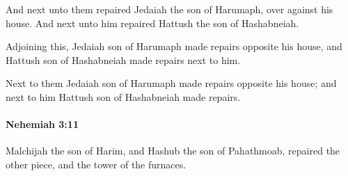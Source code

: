 			\begin{versebox}
					\item[BHS] 
					\item[LXX] 
					\item[ASV] And next unto them repaired Jedaiah the son of Harumaph, over against his house. And next unto him repaired Hattush the son of Hashabneiah.
					\item[NIV] Adjoining this, Jedaiah son of Harumaph made repairs opposite his house, and Hattush son of Hashabneiah made repairs next to him.
					\item[NRSV] Next to them Jedaiah son of Harumaph made repairs opposite his house; and next to him Hattush son of Hashabneiah made repairs.
			\end{versebox}

		\paragraph{Nehemiah 3:11} %
			\label{NEHEMIAH-3-11}

			Malchijah the son of Harim, and Hashub the son of Pahathmoab, repaired the other piece, and the tower of the furnaces.

